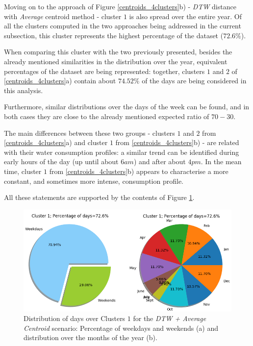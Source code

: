 \documentclass[9pt,journal,compsoc]{IEEEtran}
\begin{document}
Moving on to the approach of Figure \ref{centroids_4clusters}b) - \emph{DTW} distance with \emph{Average} centroid method - cluster $1$ is also spread over the entire year. Of all the clusters computed in the two approaches being addressed in the current subsection, this cluster represents the highest percentage of the dataset ($72.6\%$).

When comparing this cluster with the two previously presented, besides the already mentioned similarities in the distribution over the year, equivalent percentages of the dataset are being represented: together, clusters $1$ and $2$ of \ref{centroids_4clusters}a) contain about $74.52\%$ of the days are being considered in this analysis.

Furthermore, similar distributions over the days of the week can be found, and in both cases they are close to the already mentioned expected ratio of $70-30$.

The main differences between these two groups - clusters $1$ and $2$ from \ref{centroids_4clusters}a) and cluster $1$ from \ref{centroids_4clusters}b) - are related with their water consumption profiles: a similar trend can be identified during early hours of the day (up until about $6am$) and after about $4pm$. In the mean time, cluster $1$ from \ref{centroids_4clusters}b) appears to characterise a more constant, and sometimes more intense, consumption profile.

All these statements are supported by the contents of Figure \ref{week_month_dist_k1_dtw_average4}.

\begin{figure}
	\centering
	\includegraphics[scale=0.4]{images/percent_week_months_dtw_average_cluster1_k4.png}
	\caption{Distribution of days over Clusters $1$ for the \emph{DTW + Average Centroid} scenario: Percentage of weekdays and weekends (a) and distribution over the months of the year (b).}
	\label{week_month_dist_k1_dtw_average4}
\end{figure}
\end{document}
